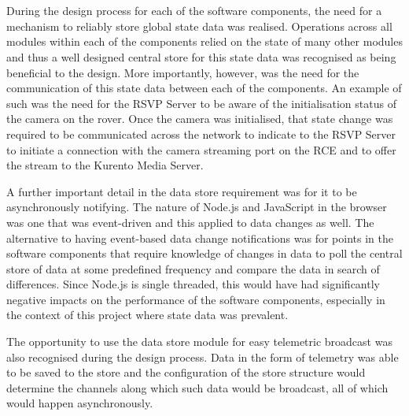       \\\\
        During the design process for each of the software components, the need for a mechanism to reliably store global state data was realised. Operations across all modules within each of the components relied on the state of many other modules and thus a well designed central store for this state data was recognised as being beneficial to the design. More importantly, however, was the need for the communication of this state data between each of the components. An example of such was the need for the RSVP Server to be aware of the initialisation status of the camera on the rover. Once the camera was initialised, that state change was required to be communicated across the network to indicate to the RSVP Server to initiate a connection with the camera streaming port on the RCE and to offer the stream to the Kurento Media Server.
        
        A further important detail in the data store requirement was for it to be asynchronously notifying. The nature of Node.js and JavaScript in the browser was one that was event-driven and this applied to data changes as well. The alternative to having event-based data change notifications was for points in the software components that require knowledge of changes in data to poll the central store of data at some predefined frequency and compare the data in search of differences. Since Node.js is single threaded, this would have had significantly negative impacts on the performance of the software components, especially in the context of this project where state data was prevalent.
        
        The opportunity to use the data store module for easy telemetric broadcast was also recognised during the design process. Data in the form of telemetry was able to be saved to the store and the configuration of the store structure would determine the channels along which such data would be broadcast, all of which would happen asynchronously.
        
